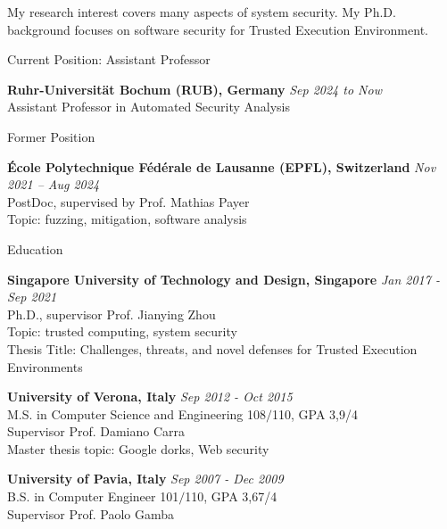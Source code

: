 \documentclass{resume} %
\begin{document}
	
My research interest covers many aspects of system security. My Ph.D. background
focuses on software security for Trusted Execution Environment. 

\begin{rSection}{Current Position: Assistant Professor}
	
	{\bf Ruhr-Universität Bochum (RUB), Germany} 
	\hfill {\em Sep 2024 to Now} \\
	Assistant Professor in Automated Security Analysis

\end{rSection}

\begin{rSection}{Former Position}
	
	{\bf \'Ecole Polytechnique F\'ed\'erale de Lausanne (EPFL), Switzerland} 
	\hfill {\em Nov 2021 -- Aug 2024} \\
	PostDoc, supervised by Prof. Mathias Payer \\
	Topic: fuzzing, mitigation, software analysis

\end{rSection}


\begin{rSection}{Education}
    
{\bf Singapore University of Technology and Design, Singapore} \hfill {\em Jan
2017 - Sep 2021} \\
Ph.D., supervisor Prof. Jianying Zhou \\
Topic: trusted computing, system security \\
Thesis Title: Challenges, threats, and novel defenses for Trusted Execution
Environments

{\bf University of Verona, Italy} \hfill {\em Sep 2012 - Oct 2015} \\
M.S. in Computer Science and Engineering 108$/$110, GPA 3,9/4 \\
Supervisor Prof. Damiano Carra \\
Master thesis topic: Google dorks, Web security


{\bf University of Pavia, Italy} \hfill {\em Sep 2007 - Dec 2009} \\ 
B.S. in Computer Engineer 101$/$110, GPA 3,67/4 \\
Supervisor Prof. Paolo Gamba \\


\end{rSection}
\end{document}
